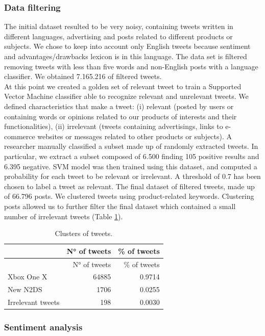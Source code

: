 \documentclass[b5paper,]{book}
\theoremstyle{definition}
\theoremstyle{definition}
\theoremstyle{definition}
\theoremstyle{remark}
\begin{document}
\subsubsection*{Data filtering}\label{data-filtering}

The initial dataset resulted to be very noisy, containing tweets written
in different languages, advertising and posts related to different
products or subjects. We chose to keep into account only English tweets
because sentiment and advantages/drawbacks lexicon is in this language.
The data set is filtered removing tweets with less than five words and
non-English posts with a language classifier. We obtained 7.165.216 of
filtered tweets.\\
At this point we created a golden set of relevant tweet to train a
Supported Vector Machine classifier able to recognize relevant and
unrelevant tweets. We defined characteristics that make a tweet: (i)
relevant (posted by users or containing words or opinions related to our
products of interests and their functionalities), (ii) irrelevant
(tweets containing advertisings, links to e-commerce websites or
messages related to other products or subjects). A researcher manually
classified a subset made up of randomly extracted tweets. In particular,
we extract a subset composed of 6.500 finding 105 positive results and
6.395 negative. SVM model was then trained using this dataset, and
computed a probability for each tweet to be relevant or irrelevant. A
threshold of 0.7 has been chosen to label a tweet as relevant. The final
dataset of filtered tweets, made up of 66.796 posts. We clustered tweets
using product-related keywords. Clustering posts allowed us to further
filter the final dataset which contained a small number of irrelevant
tweets (Table \ref{tab:tweetab1}).

\begin{longtable}[]{@{}lrr@{}}
\caption{\label{tab:tweetab1} Clusters of tweets.}\tabularnewline
\toprule
& N° of tweets & \% of tweets\tabularnewline
\midrule
\endfirsthead
\toprule
& N° of tweets & \% of tweets\tabularnewline
\midrule
\endhead
Xbox One X & 64885 & 0.9714\tabularnewline
New N2DS & 1706 & 0.0255\tabularnewline
Irrelevant tweets & 198 & 0.0030\tabularnewline
\bottomrule
\end{longtable}

\subsubsection*{Sentiment analysis}\label{sentiment-analysis}
\end{document}
